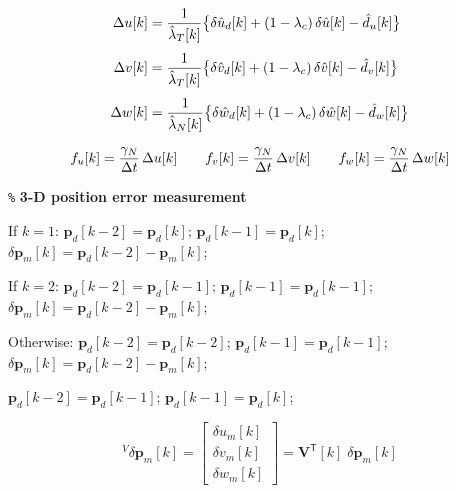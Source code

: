 \documentclass[UTF8,11pt,a4paper]{ctexart}
\newcommand{\tp}{^{\!\mathsf{T}}}
\newcommand{\VkT}{\mathbf{V}\tp\![k]}
\newcommand{\gN}{\gamma_N}
\newcommand{\dt}{\Delta t}
\newcommand{\lc}{\lambda_c}
\newcommand{\lamhat}[1]{\hat{\lambda}_{#1}[k]}   %
\newcommand{\dhat}[1]{\hat{d}_{#1}[k]}          %
\begin{document}
\begin{align}
\Delta u[k] &= \frac{1}{\lamhat{T}}
\bigl\{\delta \hat{u}_d[k] + (1-\lc)\,\delta \hat{u}[k] - \dhat{u}\bigr\} \notag\\[4pt]
\Delta v[k] &= \frac{1}{\lamhat{T}}
\bigl\{\delta \hat{v}_d[k] + (1-\lc)\,\delta \hat{v}[k] - \dhat{v}\bigr\} \notag\\[4pt]
\Delta w[k] &= \frac{1}{\lamhat{N}}
\bigl\{\delta \hat{w}_d[k] + (1-\lc)\,\delta \hat{w}[k] - \dhat{w}\bigr\} \notag
\end{align}

\begin{align}
f_u[k] = \frac{\gN}{\dt}\,\Delta u[k] \qquad
f_v[k] = \frac{\gN}{\dt}\,\Delta v[k] \qquad
f_w[k] = \frac{\gN}{\dt}\,\Delta w[k] \notag
\end{align}

\medskip
\noindent\texttt{\%} \textbf{3-D position error measurement}

\medskip
\noindent
If $k=1$:\quad
$\mathbf{p}_d[k\!-\!2] = \mathbf{p}_d[k]$;\;
$\mathbf{p}_d[k\!-\!1] = \mathbf{p}_d[k]$;\;
$\delta\mathbf{p}_m[k] = \mathbf{p}_d[k\!-\!2] - \mathbf{p}_m[k]$;

\smallskip\noindent
If $k=2$:\quad
$\mathbf{p}_d[k\!-\!2] = \mathbf{p}_d[k\!-\!1]$;\;
$\mathbf{p}_d[k\!-\!1] = \mathbf{p}_d[k\!-\!1]$;\;
$\delta\mathbf{p}_m[k] = \mathbf{p}_d[k\!-\!2] - \mathbf{p}_m[k]$;

\smallskip\noindent
Otherwise:\quad
$\mathbf{p}_d[k\!-\!2] = \mathbf{p}_d[k\!-\!2]$;\;
$\mathbf{p}_d[k\!-\!1] = \mathbf{p}_d[k\!-\!1]$;\;
$\delta\mathbf{p}_m[k] = \mathbf{p}_d[k\!-\!2] - \mathbf{p}_m[k]$;

\smallskip\noindent
$\mathbf{p}_d[k\!-\!2] = \mathbf{p}_d[k\!-\!1]$;\;
$\mathbf{p}_d[k\!-\!1] = \mathbf{p}_d[k]$;

\medskip
\[
{}^V\!\delta\mathbf{p}_m[k]
= \begin{bmatrix}\delta u_m[k]\\\delta v_m[k]\\\delta w_m[k]\end{bmatrix}
= \VkT\;\delta\mathbf{p}_m[k]
\]
\end{document}
